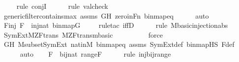 \begin{isabellebody}
\ \ \ \ \isamarkupfalse%
{\isacharparenleft}{\kern0pt}rule\ conjI{\isacharparenright}{\kern0pt}\isanewline
\ \ \ \ \ \isamarkupfalse%
{\isacharparenleft}{\kern0pt}rule\ valcheck{\isacharparenright}{\kern0pt}\isanewline
\ \ \ \ \isamarkupfalse%
\ generic{\isacharunderscore}{\kern0pt}filter{\isacharunderscore}{\kern0pt}contains{\isacharunderscore}{\kern0pt}max\ assms\ GH\ zero{\isacharunderscore}{\kern0pt}in{\isacharunderscore}{\kern0pt}Fn\ binmap{\isacharunderscore}{\kern0pt}eq\isanewline
\ \ \ \ \isamarkupfalse%
\ auto\isanewline
\ \ \isamarkupfalse%
\ \isamarkupfalse%
\ Finj{\isacharcolon}{\kern0pt}\ {\isachardoublequoteopen}F\ {\isasymin}\ inj{\isacharparenleft}{\kern0pt}nat{\isacharcomma}{\kern0pt}\ binmap{\isacharparenleft}{\kern0pt}G{\isacharparenright}{\kern0pt}{\isacharparenright}{\kern0pt}{\isachardoublequoteclose}\isanewline
\ \ \ \ \isamarkupfalse%
{\isacharparenleft}{\kern0pt}rule{\isacharunderscore}{\kern0pt}tac\ iffD{}{\isacharparenright}{\kern0pt}\isanewline
\ \ \ \ \ \isamarkupfalse%
{\isacharparenleft}{\kern0pt}rule\ M{\isacharunderscore}{\kern0pt}basic{\isachardot}{\kern0pt}injection{\isacharunderscore}{\kern0pt}abs{\isacharparenright}{\kern0pt}\isanewline
\ \ \ \ \isamarkupfalse%
\ SymExt{\isacharunderscore}{\kern0pt}M{\isacharunderscore}{\kern0pt}ZF{\isacharunderscore}{\kern0pt}trans\ M{\isacharunderscore}{\kern0pt}ZF{\isacharunderscore}{\kern0pt}trans{\isachardot}{\kern0pt}mbasic\isanewline
\ \ \ \ \ \ \ \ \isamarkupfalse%
\ force\isanewline
\ \ \ \ \isamarkupfalse%
\ GH\ M{\isacharunderscore}{\kern0pt}subset{\isacharunderscore}{\kern0pt}SymExt\ nat{\isacharunderscore}{\kern0pt}in{\isacharunderscore}{\kern0pt}M\ binmap{\isacharunderscore}{\kern0pt}eq\ assms\ SymExt{\isacharunderscore}{\kern0pt}def\ binmap{\isacharprime}{\kern0pt}{\isacharunderscore}{\kern0pt}HS\ F{\isacharunderscore}{\kern0pt}def\isanewline
\ \ \ \ \isamarkupfalse%
\ auto\isanewline
\isanewline
\ \ \isamarkupfalse%
\ {\isachardoublequoteopen}F\ {\isasymin}\ bij{\isacharparenleft}{\kern0pt}nat{\isacharcomma}{\kern0pt}\ range{\isacharparenleft}{\kern0pt}F{\isacharparenright}{\kern0pt}{\isacharparenright}{\kern0pt}{\isachardoublequoteclose}\ \isanewline
\ \ \ \ \isamarkupfalse%
{\isacharparenleft}{\kern0pt}rule\ inj{\isacharunderscore}{\kern0pt}bij{\isacharunderscore}{\kern0pt}range{\isacharparenright}{\kern0pt}\isanewline

\end{isabellebody}
